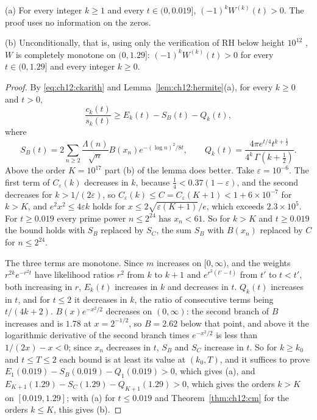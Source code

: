 \begin{theorem}\label{thm:ch12:cmint}
\textup{(a)} For every integer $k\ge1$ and every $t\in(0,0.019]$, $(-1)^kW^{(k)}(t)>0$. The proof uses no information on the zeros.

\textup{(b)} Unconditionally, that is, using only the verification of RH below height $10^{12}$ \cite{PT21}, $W$ is completely monotone on $(0,1.29]$: $(-1)^kW^{(k)}(t)>0$ for every $t\in(0,1.29]$ and every integer $k\ge0$.
\end{theorem}

\begin{proof}
By \eqref{eq:ch12:ckarith} and Lemma~\ref{lem:ch12:hermite}(a), for every $k\ge0$ and $t>0$,
\[
\frac{c_k(t)}{s_k(t)}\ge E_k(t)-S_B(t)-Q_k(t),
\]
where
\[
S_B(t)=2\sum_{n\ge2}\frac{\Lambda(n)}{\sqrt n}B(x_n)e^{-(\log n)^2/8t},\qquad Q_k(t)=\frac{4\pi e^{t/4}t^{k+\frac12}}{4^k\,\Gamma(k+\frac12)}.
\]
Above the order $K=10^{17}$ part (b) of the lemma does better. Take $\varepsilon=10^{-6}$. The first term of $C_\varepsilon(k)$ decreases in $k$, because $\frac14<0.37(1-\varepsilon)$, and the second decreases for $k>1/(2\varepsilon)$, so $C_\varepsilon(k)\le C=C_\varepsilon(K+1)<1+6\times10^{-7}$ for $k>K$, and $e^2x^2\le4\varepsilon k$ holds for $x\le2\sqrt{\varepsilon(K+1)}/e$, which exceeds $2.3\times10^5$. For $t\ge0.019$ every prime power $n\le2^{24}$ has $x_n<61$. So for $k>K$ and $t\ge0.019$ the bound holds with $S_B$ replaced by $S_C$, the sum $S_B$ with $B(x_n)$ replaced by $C$ for $n\le2^{24}$.

The three terms are monotone. Since $m$ increases on $[0,\infty)$, and the weights $r^{2k}e^{-r^2t}$ have likelihood ratios $r^2$ from $k$ to $k+1$ and $e^{r^2(t'-t)}$ from $t'$ to $t<t'$, both increasing in $r$, $E_k(t)$ increases in $k$ and decreases in $t$. $Q_k(t)$ increases in $t$, and for $t\le2$ it decreases in $k$, the ratio of consecutive terms being $t/(4k+2)$. $B(x)e^{-x^2/2}$ decreases on $(0,\infty)$: the second branch of $B$ increases and is $1.78$ at $x=2^{-1/2}$, so $B=2.62$ below that point, and above it the logarithmic derivative of the second branch times $e^{-x^2/2}$ is less than $1/(2x)-x<0$; since $x_n$ decreases in $t$, $S_B$ and $S_C$ increase in $t$. So for $k\ge k_0$ and $t\le T\le2$ each bound is at least its value at $(k_0,T)$, and it suffices to prove $E_1(0.019)-S_B(0.019)-Q_1(0.019)>0$, which gives (a), and $E_{K+1}(1.29)-S_C(1.29)-Q_{K+1}(1.29)>0$, which gives the orders $k>K$ on $[0.019,1.29]$; with (a) for $t\le0.019$ and Theorem~\ref{thm:ch12:cm} for the orders $k\le K$, this gives (b).


\end{proof}
